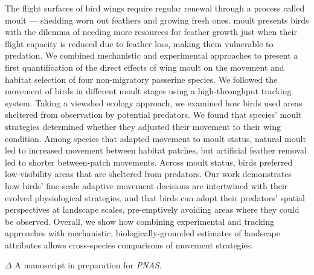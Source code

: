 \small{
    The flight surfaces of bird wings require regular renewal through a process called moult --- shedding worn out feathers and growing fresh ones.
    moult presents birds with the dilemma of needing more resources for feather growth just when their flight capacity is reduced due to feather loss, making them vulnerable to predation.
    We combined mechanistic and experimental approaches to present a first quantification of the direct effects of wing moult on the movement and habitat selection of four non-migratory passerine species. 
    We followed the movement of birds in different moult stages using a high-throughput tracking system. 
    Taking a viewshed ecology approach, we examined how birds used areas sheltered from observation by potential predators.
    We found that species' moult strategies determined whether they adjusted their movement to their wing condition. 
    Among species that adapted movement to moult status, natural moult led to increased movement between habitat patches, but artificial feather removal led to shorter between-patch movements. 
    Across moult status, birds preferred low-visibility areas that are sheltered from predators.
    Our work demonstrates how birds’ fine-scale adaptive movement decisions are intertwined with their evolved physiological strategies, and that birds can adopt their predators’ spatial perspectives at landscape scales, pre-emptively avoiding areas where they could be observed.
    Overall, we show how combining experimental and tracking approaches with mechanistic, biologically-grounded estimates of landscape attributes allows cross-species comparisons of movement strategies.

    \bigskip

    {\noindent \large{$\Delta$}} \normalfont A manuscript in preparation for \textit{PNAS}.

}

\clearpage
